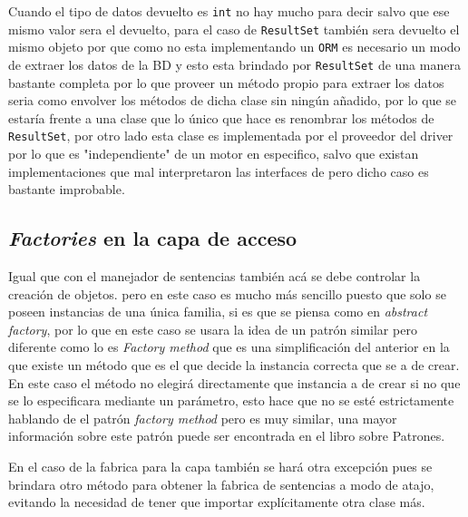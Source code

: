 Cuando el tipo de datos devuelto es \verb=int= no hay mucho para decir salvo que ese mismo valor sera el devuelto, para el caso de \verb=ResultSet= también sera devuelto el mismo objeto por que como \jj no esta implementando un \verb=ORM= es necesario un modo de extraer los datos de la BD y esto esta brindado por \verb=ResultSet= de una manera bastante completa por lo que proveer un método propio para extraer los datos seria como envolver los métodos de dicha clase sin ningún añadido, por lo que se estaría frente a una clase que lo único que hace es renombrar los métodos de \verb=ResultSet=, por otro lado esta clase es implementada por el proveedor del driver por lo que es "independiente" de un motor en especifico, salvo que existan implementaciones que mal interpretaron las interfaces de \jd pero dicho caso es bastante improbable.
%
\subsection{\textit{Factories} en la capa de acceso}
Igual que con el manejador de sentencias también acá se debe controlar la creación de objetos. pero en este caso es mucho más sencillo puesto que solo  se poseen instancias de una única familia, si es que se piensa como en \textit{abstract factory}, por lo que en este caso se usara la idea de un patrón similar pero diferente como lo es \textit{Factory method} que es una simplificación del anterior en la que existe un método que es el que decide la instancia correcta que se a de crear. En este caso el método no elegirá directamente que instancia a de crear si no que se lo especificara mediante un parámetro, esto hace que no se esté estrictamente hablando de el patrón \textit{factory method} pero es muy similar, una mayor información sobre este patrón puede ser encontrada en el libro sobre Patrones\citep{Metsker:2002:DPJ}. 

En el caso de la fabrica para la capa también se hará otra excepción pues se brindara otro método para obtener la fabrica de sentencias a modo de atajo, evitando la necesidad de tener que importar explícitamente otra clase más.